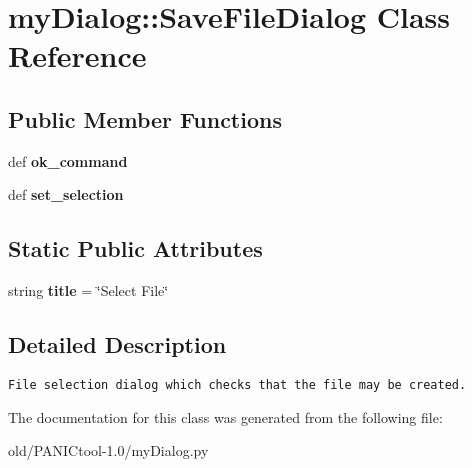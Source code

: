 \section{my\-Dialog::Save\-File\-Dialog Class Reference}
\label{classmyDialog_1_1SaveFileDialog}
\subsection*{Public Member Functions}
\begin{CompactItemize}
\item 
def \textbf{ok\_\-command}\label{classmyDialog_1_1SaveFileDialog_a80cf2a9d4cf17da13585ba7183ed736}

\item 
def \textbf{set\_\-selection}\label{classmyDialog_1_1SaveFileDialog_c240d7c3361a15e171fc5eb6e46bfa59}

\end{CompactItemize}
\subsection*{Static Public Attributes}
\begin{CompactItemize}
\item 
string \textbf{title} = \char`\"{}Select File\char`\"{}\label{classmyDialog_1_1SaveFileDialog_9d60b5a42179a603ea6ff3b6298f1c32}

\end{CompactItemize}


\subsection{Detailed Description}


\footnotesize\begin{verbatim}File selection dialog which checks that the file may be created.\end{verbatim}
\normalsize
 



The documentation for this class was generated from the following file:\begin{CompactItemize}
\item 
old/PANICtool-1.0/my\-Dialog.py\end{CompactItemize}
